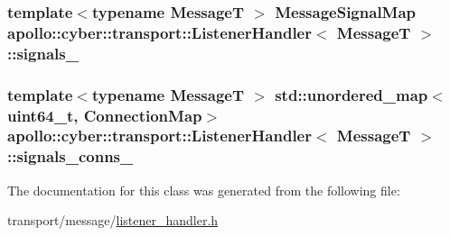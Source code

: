 \hypertarget{classapollo_1_1cyber_1_1transport_1_1ListenerHandler_ac550b705bbbc6a60cb13d5208db3a716}{
\subsubsection[{signals\-\_\-}]{\setlength{\rightskip}{0pt plus 5cm}template$<$typename Message\-T $>$ {\bf Message\-Signal\-Map} {\bf apollo\-::cyber\-::transport\-::\-Listener\-Handler}$<$ Message\-T $>$\-::signals\-\_\-\hspace{0.3cm}{\ttfamily [private]}}}\label{classapollo_1_1cyber_1_1transport_1_1ListenerHandler_ac550b705bbbc6a60cb13d5208db3a716}
\hypertarget{classapollo_1_1cyber_1_1transport_1_1ListenerHandler_aae870e557a50628cfe739df1a8ab6547}{
\subsubsection[{signals\-\_\-conns\-\_\-}]{\setlength{\rightskip}{0pt plus 5cm}template$<$typename Message\-T $>$ std\-::unordered\-\_\-map$<$uint64\-\_\-t, {\bf Connection\-Map}$>$ {\bf apollo\-::cyber\-::transport\-::\-Listener\-Handler}$<$ Message\-T $>$\-::signals\-\_\-conns\-\_\-\hspace{0.3cm}{\ttfamily [private]}}}\label{classapollo_1_1cyber_1_1transport_1_1ListenerHandler_aae870e557a50628cfe739df1a8ab6547}


The documentation for this class was generated from the following file\-:\begin{DoxyCompactItemize}
\item 
transport/message/\hyperlink{listener__handler_8h}{listener\-\_\-handler.\-h}\end{DoxyCompactItemize}
